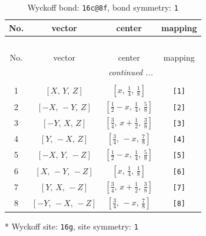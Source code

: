 \documentclass[fleqn,8pt]{jsarticle}
\begin{document}
\renewcommand{\arraystretch}{1.2}
\begin{longtable}{cccc}
\caption{Wyckoff bond: {\tt 16c@8f}, bond symmetry: {\tt 1}}
 \\
 \hline \hline
No. & vector & center & mapping \\ \hline \endfirsthead

\multicolumn{3}{l}{\tablename\ \thetable{}} \\
 \hline \hline
No. & vector & center & mapping \\ \hline \endhead

 \hline \hline
\multicolumn{3}{r}{\footnotesize\it continued ...} \\ \endfoot

 \hline \hline
\multicolumn{3}{r}{} \\ \endlastfoot

1 & $\left[ X,\, Y,\, Z \right]$ & $\left[ x,\, \frac{1}{4},\, \frac{1}{8} \right]$ & {\tt [1]} \\ \hline
2 & $\left[ - X,\, - Y,\, Z \right]$ & $\left[ \frac{1}{2} - x,\, \frac{1}{4},\, \frac{5}{8} \right]$ & {\tt [2]} \\ \hline
3 & $\left[ - Y,\, X,\, Z \right]$ & $\left[ \frac{3}{4},\, x + \frac{1}{2},\, \frac{3}{8} \right]$ & {\tt [3]} \\ \hline
4 & $\left[ Y,\, - X,\, Z \right]$ & $\left[ \frac{3}{4},\, - x,\, \frac{7}{8} \right]$ & {\tt [4]} \\ \hline
5 & $\left[ - X,\, Y,\, - Z \right]$ & $\left[ \frac{1}{2} - x,\, \frac{1}{4},\, \frac{5}{8} \right]$ & {\tt [5]} \\ \hline
6 & $\left[ X,\, - Y,\, - Z \right]$ & $\left[ x,\, \frac{1}{4},\, \frac{1}{8} \right]$ & {\tt [6]} \\ \hline
7 & $\left[ Y,\, X,\, - Z \right]$ & $\left[ \frac{3}{4},\, x + \frac{1}{2},\, \frac{3}{8} \right]$ & {\tt [7]} \\ \hline
8 & $\left[ - Y,\, - X,\, - Z \right]$ & $\left[ \frac{3}{4},\, - x,\, \frac{7}{8} \right]$ & {\tt [8]} \\
\end{longtable}
* Wyckoff site: {\tt 16g}, site symmetry: {\tt 1}
\renewcommand{\arraystretch}{1.2}
\end{document}
